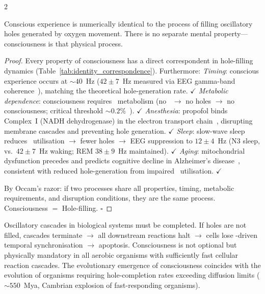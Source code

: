 \begin{multicols}{2}

\begin{theorem}
\label{thm:identity}
Conscious experience is numerically identical to the process of filling
oscillatory holes generated by oxygen movement.  There is no separate
mental property---consciousness is that physical process.
\end{theorem}

\begin{proof}
Every property of consciousness has a direct correspondent in hole-filling
dynamics (Table~\ref{tab:identity_correspondence}).  Furthermore:
\emph{Timing}: conscious experience occurs at $\sim40$~Hz ($42\pm7$~Hz
measured via EEG gamma-band coherence~\citep{tononi2016integrated}),
matching the theoretical hole-generation rate. $\checkmark$
\emph{Metabolic dependence}: consciousness requires \Otwo\ metabolism
(no \Otwo\ $\to$ no holes $\to$ no consciousness; critical threshold
$\sim0.2\%$~\citep{hackett2004hypoxia}). $\checkmark$
\emph{Anesthesia}: propofol binds Complex~I (NADH dehydrogenase) in the
electron transport chain~\citep{branca2014propofol}, disrupting membrane
cascades and preventing hole generation. $\checkmark$
\emph{Sleep}: slow-wave sleep reduces \Otwo\ utilisation $\to$ fewer holes
$\to$ EEG suppression to $12\pm4$~Hz (N3 sleep, vs.\ $42\pm7$~Hz waking;
REM $38\pm9$~Hz maintained). $\checkmark$
\emph{Aging}: mitochondrial dysfunction precedes and predicts cognitive
decline in Alzheimer's disease~\citep{swerdlow2014mitochondria}, consistent
with reduced hole-generation from impaired \Otwo\ utilisation. $\checkmark$

By Occam's razor: if two processes share all properties, timing, metabolic
requirements, and disruption conditions, they are the same process.
Consciousness $=$ Hole-filling. $\square$
\end{proof}

\begin{corollary}
\label{cor:mandatory}
Oscillatory cascades in biological systems must be completed.  If holes are
not filled, cascades terminate $\to$ all downstream reactions halt $\to$
cells lose \Otwo-driven temporal synchronisation $\to$ apoptosis.
Consciousness is not optional but physically mandatory in all aerobic
organisms with sufficiently fast cellular reaction cascades.  The
evolutionary emergence of consciousness coincides with the evolution of
organisms requiring hole-completion rates exceeding diffusion limits
(${\sim}550$~Mya, Cambrian explosion of fast-responding organisms).
\end{corollary}


\end{multicols}
